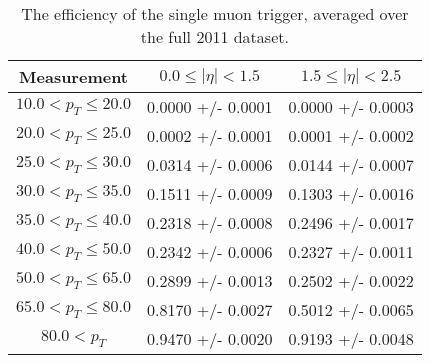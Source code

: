  \begin{table}[!ht]
 \begin{center} 
 \begin{tabular}{|c|c|c|}
 \hline
 Measurement &  $  0.0  \le |\eta| <   1.5$ & $  1.5  \le |\eta| <   2.5$ \\ 
 \hline           
$ 10.0 < p_{T} \le  20.0$ &     0.0000 +/- 0.0001  &      0.0000 +/- 0.0003 \\ 
\hline
$ 20.0 < p_{T} \le  25.0$ &     0.0002 +/- 0.0001  &      0.0001 +/- 0.0002 \\ 
\hline
$ 25.0 < p_{T} \le  30.0$ &     0.0314 +/- 0.0006  &      0.0144 +/- 0.0007 \\ 
\hline
$ 30.0 < p_{T} \le  35.0$ &     0.1511 +/- 0.0009  &      0.1303 +/- 0.0016 \\ 
\hline
$ 35.0 < p_{T} \le  40.0$ &     0.2318 +/- 0.0008  &      0.2496 +/- 0.0017 \\ 
\hline
$ 40.0 < p_{T} \le  50.0$ &     0.2342 +/- 0.0006  &      0.2327 +/- 0.0011 \\ 
\hline
$ 50.0 < p_{T} \le  65.0$ &     0.2899 +/- 0.0013  &      0.2502 +/- 0.0022 \\ 
\hline
$ 65.0 < p_{T} \le  80.0$ &     0.8170 +/- 0.0027  &      0.5012 +/- 0.0065 \\ 
\hline
$ 80.0 < p_{T} $ &     0.9470 +/- 0.0020  &      0.9193 +/- 0.0048 \\ 
\hline
\end{tabular}
\caption{The efficiency of the single muon trigger, averaged over the full 2011 dataset.}
\label{tab:eff_trigger_singleEle}
\end{center}
\end{table}




